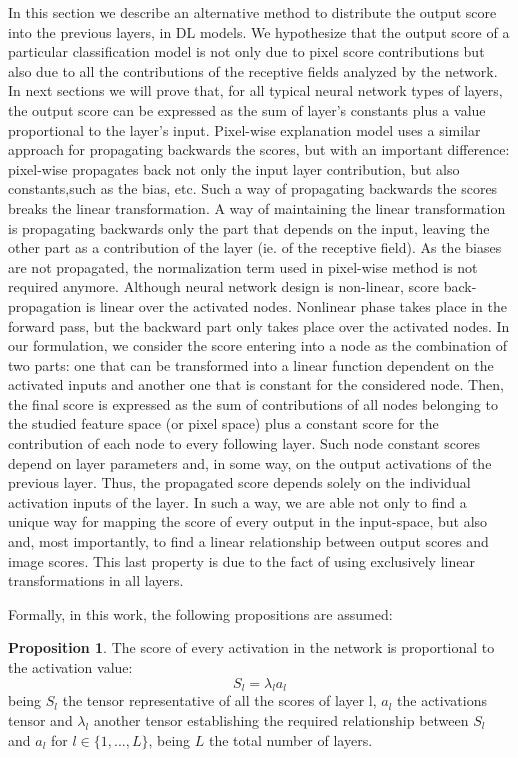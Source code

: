 \documentclass[review]{elsarticle}
\theoremstyle{definition} %
\newtheorem{proposition}{Proposition}%
\theoremstyle{remark}
\begin{document}
In this section we describe an alternative method to distribute the output score into the previous layers, in DL models. We hypothesize that the output score of a particular classification model is not only due to pixel score contributions but also due to all the contributions of the receptive fields analyzed by the network. In next sections we will prove that, for all typical neural network types of layers, the output score can be expressed as the sum of layer's constants plus a value proportional to the layer's input. Pixel-wise explanation model uses a similar approach for propagating backwards the scores, but with an important difference: pixel-wise \cite{bach2015pixel} propagates back not only the input layer contribution, but also constants,such as the bias, etc. Such a way of propagating backwards the scores breaks the linear transformation. A way of maintaining the linear transformation is propagating backwards only the part that depends on the input, leaving the other part as a contribution of the layer (ie. of the receptive field). As the biases are not propagated, the normalization term used in pixel-wise method is not required anymore. Although neural network design is non-linear, score back-propagation is linear over the activated nodes. Nonlinear phase takes place in the forward pass, but the backward part only takes place over the activated nodes. In our formulation, we consider the score entering into a node as the combination of two parts: one that can be transformed into a linear function dependent on the activated inputs and another one that is constant for the considered node. Then, the final score is expressed as the sum of contributions of all nodes belonging to the studied feature space (or pixel space) plus a constant score for the contribution of each node to every following layer.
Such node constant scores depend on layer parameters and, in some way, on the output activations of the previous layer. Thus, the propagated score depends solely on the individual activation inputs of the layer. In such a way, we are able not only to find a unique way for mapping the score of every output in the input-space, but also and, most importantly, to find a linear relationship between output scores and image scores. This last property is due to the fact of using exclusively linear transformations in all layers.

Formally, in this work, the following propositions are assumed:

\begin{proposition}
	The score of every activation in the network is proportional to the activation value:
	\begin{equation}
	S_l = \lambda_l a_{l}
	\end{equation}
	being $S_l$ the tensor representative of all the scores of layer l, $a_l$ the activations tensor and $\lambda_l$ another tensor establishing the required relationship between $S_l$ and $a_l$ for $l \in \{1, ..., L\}$, being $L$ the total number of layers.
\end{proposition}
\end{document}
